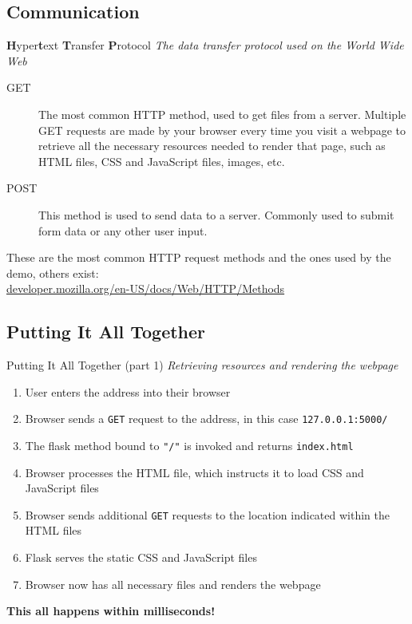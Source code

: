 \documentclass{beamer}
\begin{document}
\subsection{Communication}
	\begin{frame}[t]{\textbf{H}yper\textbf{t}ext \textbf{T}ransfer
			\textbf{P}rotocol}
		\textit{The data transfer protocol used on the World Wide Web}

		\begin{description}
			\item[GET]{
					The most common HTTP method, used to get files from a
					server. Multiple GET requests are made by your browser
					every time you visit a webpage to retrieve all the
					necessary resources needed to render that page, such as
					HTML files, CSS and JavaScript files, images, etc.
					\vspace{0.15cm}
				}
			\pause
			\item[POST]{
				This method is used to send data to a server. Commonly
				used to submit form data or any other user input.
			}
		\end{description}
		\pause

		\vspace{0.25cm}
		These are the most common HTTP request methods and the ones used by the
		demo, others exist: \\
		\vspace{0.15cm}
		\url{developer.mozilla.org/en-US/docs/Web/HTTP/Methods}
	\end{frame}

\subsection{Putting It All Together}
	\begin{frame}[t]{Putting It All Together (part 1)}
		\setbeamercovered{}
		\textit{Retrieving resources and rendering the webpage}
		\begin{enumerate}
			\item{User enters the address into their browser}
			\pause
			\item{Browser sends a \texttt{GET} request to the address, in this case
					\texttt{127.0.0.1:5000/}}
			\pause
			\item{The flask method bound to \texttt{"/"} is invoked and returns
					\texttt{index.html}}
			\pause
			\item{Browser processes the HTML file, which instructs it to load
					CSS and JavaScript files}
			\pause
			\item{Browser sends additional \texttt{GET} requests to the
					location indicated within the HTML files}
			\pause
			\item{Flask serves the static CSS and JavaScript files}
			\pause
			\item{Browser now has all necessary files and renders the webpage}
		\end{enumerate}
		\pause

		\large{\textbf{This all happens within milliseconds!}}
	\end{frame}
\end{document}

